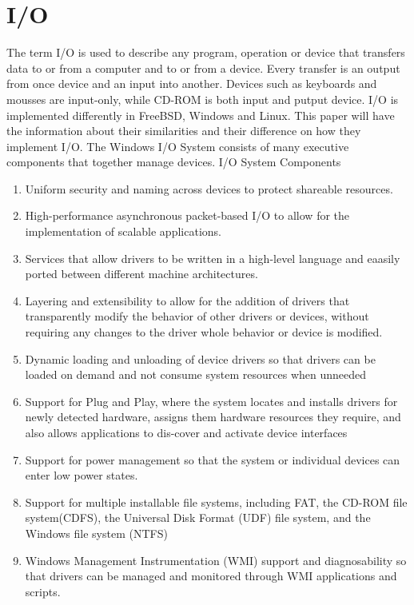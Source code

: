 \documentclass[letterpaper,10pt,draftclsnofoot,onecolumn]{IEEEtran}
\begin{document}
\section*{I/O}
The term I/O is used to describe any program, operation or device that transfers data to or from a computer and to or from a device. Every transfer is an output from once device and an input into another. Devices such as keyboards and mousses are input-only, while CD-ROM is both input and putput device. I/O is implemented differently in FreeBSD, Windows and Linux. This paper will have the information about their similarities and their difference on how they implement I/O.
The Windows I/O System consists of many executive components that together manage devices. 
I/O System Components
\begin{enumerate}
\item Uniform security and naming across devices to protect shareable resources.
\item High-performance asynchronous packet-based I/O to allow for the implementation of scalable applications.
\item Services that allow drivers to be written in a high-level language and eaasily ported between different machine architectures.
\item Layering and extensibility to allow for the addition of drivers that transparently modify the behavior of other drivers or devices, without requiring any changes to the driver whole behavior or device is modified.
\item Dynamic loading and unloading of device drivers so that drivers can be loaded on demand and not consume system resources when unneeded
\item Support for Plug and Play, where the system locates and installs drivers for newly detected hardware, assigns them hardware resources they require, and also allows applications to dis-cover and activate device interfaces
\item Support for power management so that the system or individual devices can enter low power states.
\item Support for multiple installable file systems, including FAT, the CD-ROM file system(CDFS), the Universal Disk Format (UDF) file system, and the Windows file system (NTFS)
\item Windows Management Instrumentation (WMI) support and diagnosability so that drivers can be managed and monitored through WMI applications and scripts.\cite{[1]}
\end{enumerate}
\end{document}
